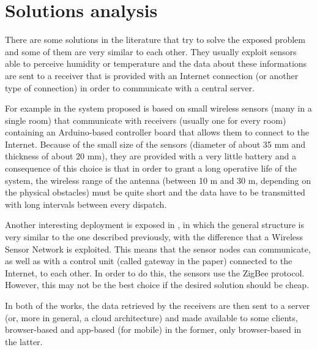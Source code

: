 \section{Solutions analysis}
\label{sec:solutions_analysis}

There are some solutions in the literature that try to solve the exposed problem and some of them are very similar to each other.
They usually exploit sensors able to perceive humidity or temperature and the data about these informations are sent to a receiver that is provided with an Internet connection (or another type of connection) in order to communicate with a central server.

For example in \cite{7969984} the system proposed is based on small wireless sensors (many in a single room) that communicate with receivers (usually one for every room) containing an Arduino-based controller board that allows them to connect to the Internet.
Because of the small size of the sensors (diameter of about 35 mm and thickness of about 20 mm), they are provided with a very little battery and a consequence of this choice is that in order to grant a long operative life of the system, the wireless range of the antenna (between 10 m and 30 m, depending on the physical obstacles) must be quite short and the data have to be transmitted with long intervals between every dispatch.

Another interesting deployment is exposed in \cite{6348392}, in which the general structure is very similar to the one described previously, with the difference that a Wireless Sensor Network is exploited.
This means that the sensor nodes can communicate, as well as with a control unit (called gateway in the paper) connected to the Internet, to each other.
In order to do this, the sensors use the ZigBee protocol. However, this may not be the best choice if the desired solution should be cheap.

In both of the works, the data retrieved by the receivers are then sent to a server (or, more in general, a cloud architecture) and made available to some clients, browser-based and app-based (for mobile) in the former, only browser-based in the latter. 